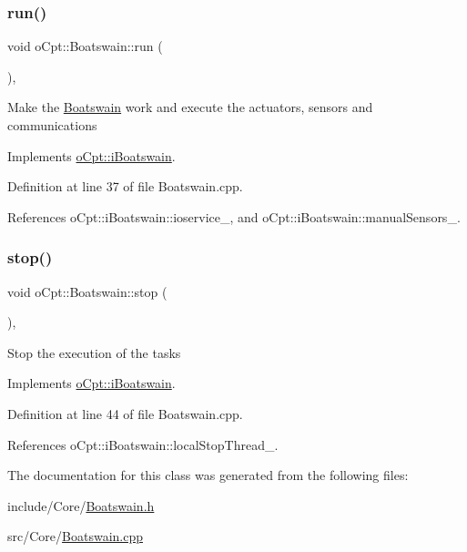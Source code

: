\subsubsection{\texorpdfstring{run()}{run()}}
{\footnotesize\ttfamily void o\+Cpt\+::\+Boatswain\+::run (\begin{DoxyParamCaption}{ }\end{DoxyParamCaption})\hspace{0.3cm}{\ttfamily [override]}, {\ttfamily [virtual]}}

Make the \hyperlink{classo_cpt_1_1_boatswain}{Boatswain} work and execute the actuators, sensors and communications 

Implements \hyperlink{classo_cpt_1_1i_boatswain_a4512e742ba996b32dcc452d9f180724a}{o\+Cpt\+::i\+Boatswain}.



Definition at line 37 of file Boatswain.\+cpp.



References o\+Cpt\+::i\+Boatswain\+::ioservice\+\_\+, and o\+Cpt\+::i\+Boatswain\+::manual\+Sensors\+\_\+.

\hypertarget{classo_cpt_1_1_boatswain_ad538cca1d6429dacf09b22c53291074f}{}\label{classo_cpt_1_1_boatswain_ad538cca1d6429dacf09b22c53291074f} 
\subsubsection{\texorpdfstring{stop()}{stop()}}
{\footnotesize\ttfamily void o\+Cpt\+::\+Boatswain\+::stop (\begin{DoxyParamCaption}{ }\end{DoxyParamCaption})\hspace{0.3cm}{\ttfamily [override]}, {\ttfamily [virtual]}}

Stop the execution of the tasks 

Implements \hyperlink{classo_cpt_1_1i_boatswain_ad1fb6362c814a72ea6c4dc9a9042cf5e}{o\+Cpt\+::i\+Boatswain}.



Definition at line 44 of file Boatswain.\+cpp.



References o\+Cpt\+::i\+Boatswain\+::local\+Stop\+Thread\+\_\+.



The documentation for this class was generated from the following files\+:\begin{DoxyCompactItemize}
\item 
include/\+Core/\hyperlink{_boatswain_8h}{Boatswain.\+h}\item 
src/\+Core/\hyperlink{_boatswain_8cpp}{Boatswain.\+cpp}\end{DoxyCompactItemize}
